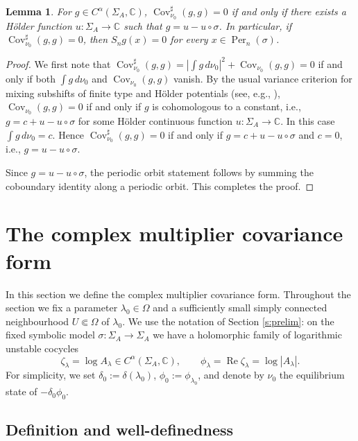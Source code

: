 \documentclass[11pt]{amsart}
\theoremstyle{plain}
\newtheorem{lem}[thm]{Lemma}
\theoremstyle{definition}
\theoremstyle{remark}
\begin{document}
\begin{lem}\label{lem:Livsic}
For $g\in C^\alpha(\Sigma_A,\mathbb C)$,
$\operatorname{Cov}^{\sharp}_{\nu_0}(g,g)=0$
if and only if there exists a H\"older function
$u\colon \Sigma_A\to\mathbb C$
such that
$g=u-u\circ\sigma$.
In particular, if
$\operatorname{Cov}^{\sharp}_{\nu_0}(g,g)=0$,
then $S_ng(x)=0$
for every $x\in\operatorname{Per}_n(\sigma)$.
\end{lem}

\begin{proof}
We first note that $\operatorname{Cov}^{\sharp}_{\nu_0}(g,g) = \left|\int g\,d\nu_0\right|^2 +
\operatorname{Cov}_{\nu_0}(g,g) = 0$ if and only if both $\int g\,d\nu_0$
and $\operatorname{Cov}_{\nu_0}(g,g)$
vanish.
By the usual variance criterion for mixing subshifts of finite type and H\"older
potentials (see, e.g., \cite{DTUZ26,PU,Parry90}),
$\operatorname{Cov}_{\nu_0}(g,g)=0$
if and only if $g$ is cohomologous to a constant, i.e.,
$g=c+u-u\circ\sigma$ for some H\"older continuous function $u\colon \Sigma_A \to \mathbb C$.
In this case
$\int g\,d\nu_0=c$.
Hence
$\operatorname{Cov}^{\sharp}_{\nu_0}(g,g)=0$
if and only if $g=c+u-u\circ\sigma$ and $c=0$, i.e.,
$g=u-u\circ\sigma$.

Since $g=u-u\circ\sigma$,
the periodic orbit statement follows by summing the coboundary identity along a periodic orbit. This completes the proof.
\end{proof}


\section{The complex multiplier covariance form}

In this section we define the complex multiplier covariance form.
Throughout the section we fix a parameter $\lambda_0\in\Omega$ and a
sufficiently small simply connected neighbourhood $U\Subset\Omega$ of
$\lambda_0$. We use the notation of Section 
\ref{s:prelim}: on the fixed symbolic
model $\sigma:\Sigma_A\to\Sigma_A$ we have a holomorphic family of
logarithmic unstable cocycles
$$
  \zeta_\lambda=\log A_\lambda\in C^\alpha(\Sigma_A,\mathbb C),
  \qquad
  \phi_\lambda=\operatorname{Re}\zeta_\lambda=\log |A_\lambda|.
$$
For simplicity, we set $\delta_0:=\delta(\lambda_0)$, $\phi_0:=\phi_{\lambda_0}$,
and denote by $\nu_0$ the equilibrium state of
$-\delta_0\phi_0$.


\subsection{Definition and well-definedness}
\end{document}
